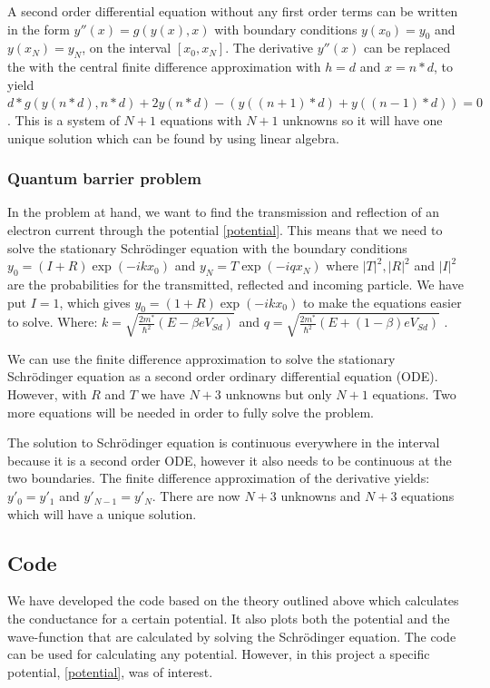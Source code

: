\documentclass[a4paper]{article}
\begin{document}
A second order differential equation without any first order terms can be written in the form $y''(x) = g(y(x),x)$ with boundary conditions $y(x_{0}) = y_{0}$ and $y(x_{N}) = y_{N}$, on the interval $[x_{0},x_{N}]$. The derivative $y''(x)$ can be replaced the with the central finite difference approximation with $h = d$ and $x = n*d$, to yield $d*g(y(n*d),n*d) + 2y(n*d)-(y((n+1)*d)+y((n-1)*d)) = 0$. This is a system of $N+1$ equations with $N+1$ unknowns so it will have one unique solution which can be found by using linear algebra.

\subsubsection{Quantum barrier problem}

In the problem at hand, we want to find the transmission and reflection of an electron current through the potential \eqref{potential}. This means that we need to solve the stationary Schr\"odinger equation with the boundary conditions $y_{0} = (I + R)\exp{(-i k x_{0})}$ and $y_{N} = T\exp{(-i q x_{N})}$ where $|T|^2,|R|^2$ and $|I|^2$ are the probabilities for the transmitted, reflected and incoming particle. We have put $I=1$, which gives $y_{0} = (1 + R)\exp{(-i k x_{0})}$ to make the equations easier to solve. Where: $k=\sqrt{\frac{2m^*}{\hbar^2}(E-\beta e V_{Sd})}$ and $q=\sqrt{\frac{2m^*}{\hbar^2}(E+ (1-\beta) e V_{Sd})}$ .

We can use the finite difference approximation to solve the stationary \\Schr\"odinger equation as a second order ordinary differential equation (ODE). However, with $R$ and $T$ we have $N+3$ unknowns but only $N+1$ equations. Two more equations will be needed in order to fully solve the problem.

The solution to Schr\"odinger equation is continuous everywhere in the interval because it is a second order ODE, however it also needs to be continuous at the two boundaries. The finite difference approximation of the derivative yields: $y'_{0}=y'_{1}$ and $y'_{N-1}=y'_{N}$. There are now $N+3$ unknowns and $N+3$ equations which will have a unique solution.


\subsection{Code}
We have developed the code based on the theory outlined above which calculates the conductance for a certain potential. It also plots both the potential and the wave-function that are calculated by solving the Schr\"odinger equation.
The code can be used for calculating any potential. However, in this project a specific potential, \eqref{potential}, was of interest.
\end{document}
